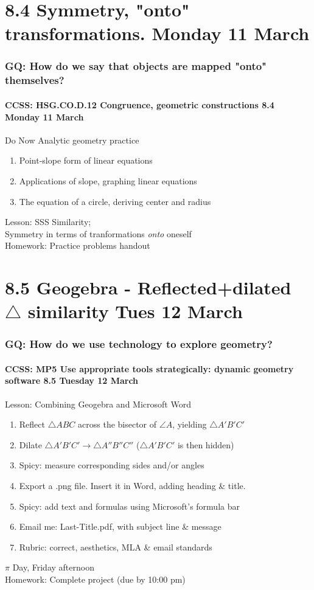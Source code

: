 \documentclass{beamer}
\begin{document}
\section{8.4 Symmetry, "onto" transformations. Monday 11 March}
  \frame
  {
    \frametitle{GQ: How do we say that objects are mapped "onto" themselves?}
    \framesubtitle{CCSS: HSG.CO.D.12 Congruence, geometric constructions \hfill \alert{8.4 Monday 11 March}}

    \begin{block}{Do Now Analytic geometry practice}
      \begin{enumerate}
        \item Point-slope form of linear equations
        \item Applications of slope, graphing linear equations
        \item The equation of a circle, deriving center and radius
      \end{enumerate}
    \end{block}
    Lesson: SSS Similarity;
    \\Symmetry in terms of tranformations \emph{onto} oneself\\[0.5cm]
    Homework: Practice problems handout
  }

\section{8.5 Geogebra - Reflected+dilated $\triangle$ similarity Tues 12 March}
  \frame
  {
    \frametitle{GQ: How do we use technology to explore geometry?}
    \framesubtitle{CCSS: MP5 Use appropriate tools strategically: dynamic geometry software \hfill \alert{8.5 Tuesday 12 March}}

    \begin{block}{Lesson: Combining Geogebra and Microsoft Word}
      \begin{enumerate}
        \item Reflect $\triangle ABC$ across the bisector of $\angle A$, yielding $\triangle A'B'C'$
        \item Dilate $\triangle A'B'C' \rightarrow \triangle A''B''C''$ ($\triangle A'B'C'$ is then hidden)
        \item Spicy: measure corresponding sides and/or angles
        \item Export a .png file. Insert it in Word, adding heading \& title.
        \item Spicy: add text and formulas using Microsoft's formula bar
        \item Email me: Last-Title.pdf, with subject line \& message
        \item Rubric: correct, aesthetics, MLA \& email standards
      \end{enumerate}
    \end{block}
    \alert{$\pi$ Day, Friday afternoon}\\
    Homework: Complete project (due by 10:00 pm)
  }
\end{document}
